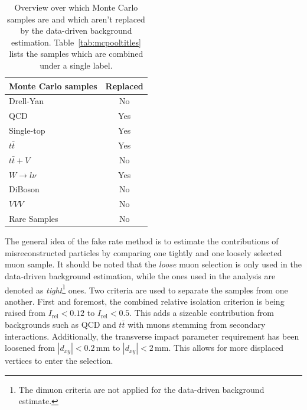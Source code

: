 \begin{table}[!htb]
  \centering
  \begin{tabular}{|l|c|}
\hline
Monte Carlo samples & Replaced \\
\hline
Drell-Yan & No \\
QCD & Yes \\
Single-top & Yes \\
$t \bar{t}$ & Yes \\
$t \bar{t} + V$ & No \\
$W \rightarrow l \nu$ & Yes \\
DiBoson & No \\
$VVV$ & No \\
Rare Samples & No \\
\hline
  \end{tabular}
  \caption{Overview over which Monte Carlo samples are and which aren't replaced by the data-driven background estimation. Table~\ref{tab:mcpooltitles} lists the samples which are combined under a single label.}
  \label{tab:fakerate-mc-overview}
\end{table}

The general idea of the fake rate method is to estimate the contributions of misreconstructed particles by comparing one tightly and one loosely selected muon sample. It should be noted that the \textit{loose} muon selection is only used in the data-driven background estimation, while the ones used in the analysis are denoted as \textit{tight}\footnote{The dimuon criteria are not applied for the data-driven background estimate.} ones. Two criteria are used to separate the samples from one another. First and foremost, the combined relative isolation criterion is being raised from $I_{\text{rel}} < 0.12$ to $I_{\text{rel}} < 0.5$. This adds a sizeable contribution from backgrounds such as QCD and $t \bar{t}$ with muons stemming from secondary interactions. Additionally, the transverse impact parameter requirement has been loosened from $|d_{xy}| < 0.2\,\text{mm}$ to $|d_{xy}| < 2\,\text{mm}$. This allows for more displaced vertices to enter the selection.

